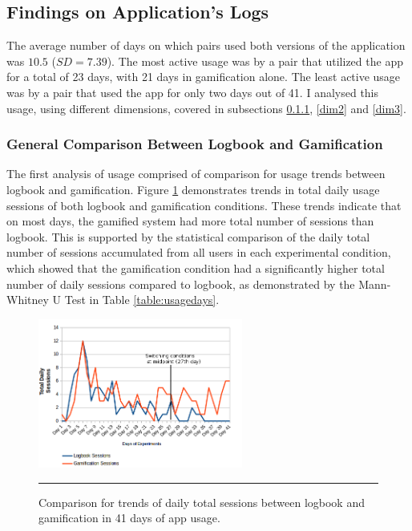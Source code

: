 \subsection{Findings on Application's Logs}
\label{usageoutcome}
The average number of days on which pairs used both versions of the application was $10.5$ ($SD=7.39$). The most active usage was by a pair that utilized the app for a total of 23 days, with 21 days in gamification alone. The least active usage was by a pair that used the app for only two days out of 41. I analysed this usage, using different dimensions, covered in subsections \ref{dim1}, \ref{dim2} and \ref{dim3}.
\subsubsection{General Comparison Between Logbook and Gamification}\label{dim1}
The first analysis of usage comprised of comparison for usage trends between logbook and gamification. Figure \ref{figure:usagedailysessions} demonstrates trends in total daily usage sessions of both logbook and gamification conditions. These trends indicate that on most days, the gamified system had more total number of sessions than logbook. This is supported by the statistical comparison of the daily total number of sessions accumulated from all users in each experimental condition, which showed that the gamification condition had a significantly higher total number of daily sessions compared to logbook, as demonstrated by the Mann-Whitney U Test in Table \ref{table:usagedays}.

\begin{figure}[htbp]
  \centering
    \includegraphics[width=0.6\textwidth]{Figures/scatter_daily_sessions.png}
    \rule{35em}{0.5pt}
  \caption{Comparison for trends of daily total sessions between logbook and gamification in 41 days of app usage.}
  \label{figure:usagedailysessions}
\end{figure}

